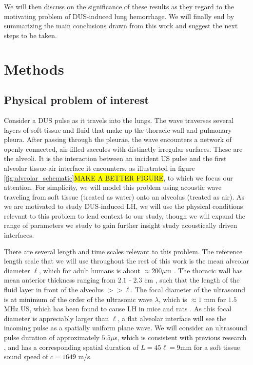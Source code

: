 \documentclass{article}
\begin{document}
We will then discuss on the significance of these results as
they regard to the motivating problem of \ac{DUS}-induced lung
hemorrhage. We will finally end by summarizing the main conclusions
drawn from this work and suggest the next steps to be taken.


%
\section{Methods} \label{sec:methods}%
\subsection{Physical problem of interest}
\label{subsec:physical_problem}
Consider a \ac{DUS} pulse as it travels into the lungs. The wave
traverses several layers of soft tissue and fluid that make up the
thoracic wall and pulmonary pleura. After passing through the pleurae,
the wave encounters a network of openly connected, air-filled saccules
with distinctly irregular surfaces. These are the alveoli. It is the
interaction between an incident \ac{US} pulse and the first alveolar
tissue-air interface it encounters, as illustrated in figure
\ref{fig:alveolar_schematic}\hl{MAKE A BETTER FIGURE}, to which we
focus our attention. For simplicity, we will model this problem using
acoustic wave traveling from soft tissue (treated as water) onto an
alveolus (treated as air). As we are motivated to study
\ac{DUS}-induced \ac{LH}, we will use the physical conditions relevant
to this problem to lend context to our study, though we will expand
the range of parameters we study to gain further insight study
acoustically driven interfaces.

There are several length and time scales relevant to this
problem. The reference length scale that we will use throughout the
rest of this work is the mean alveolar diameter $\ell$, which for
adult humans is about $\approx 200 \mu$m \citep{Ochs2004}. The
thoracic wall has mean anterior thickness ranging from $2.1$ - $2.3$
cm \cite{McLean2011}, such that the length of the fluid layer in front
of the alveolus $>>\ell$. The focal diameter of the ultrasound is at
minimum of the order of the ultrasonic wave $\lambda$, which is
$\approx 1$ mm for $1.5$ MHz \ac{US}, which has been found to cause
\ac{LH} in mice and rats \cite{Child1990,Miller2015a}. As this focal diameter is
appreciably larger than $\ell$, a flat alveolar interface will see the
incoming pulse as a spatially uniform plane wave. We will consider an
ultrasound pulse duration of approximately $5.5 \mu$s, which is
consistent with previous research \citep{Child1990}, and has a
corresponding spatial duration of $L=45\ell = 9$mm for a soft tissue sound
speed of $c=1649$ m/s. 
\end{document}
